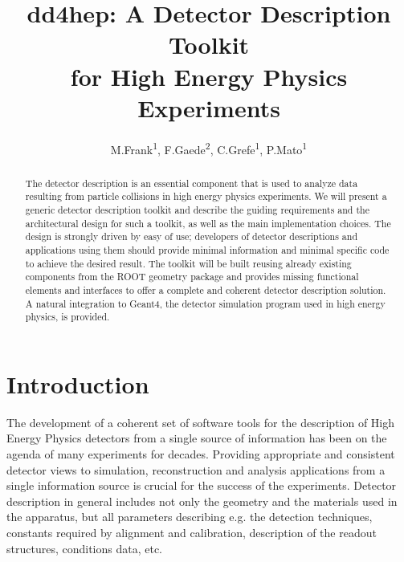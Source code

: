 \documentclass[a4paper]{jpconf}
\begin{document}
\title{dd4hep: A Detector Description Toolkit \\
for High Energy Physics Experiments}

\author{
M.Frank\textsuperscript{1},
F.Gaede\textsuperscript{2},
C.Grefe\textsuperscript{1},
P.Mato\textsuperscript{1}
}

\address{\textsuperscript{1} CERN, 1211 Geneva 23, Switzerland}
\address{\textsuperscript{2} Desy, 22607 Hamburg, Germany}


\begin{abstract}

\noindent
The detector description is an essential component that is used to analyze data
resulting from particle collisions in high energy physics experiments.
We will present a generic detector description toolkit
and describe the guiding requirements and the architectural design for
such a toolkit, as well as the main implementation choices.
The design is strongly driven by easy of use;
developers of detector descriptions and applications using
them should provide minimal information and minimal specific
code to achieve the desired result.
The toolkit will be built reusing already existing components
from the ROOT geometry package and provides missing functional
elements and interfaces to offer a complete and coherent
detector description solution. A natural integration to
Geant4, the detector simulation program used in high energy physics,
is provided.
\end{abstract}


\section{Introduction}
\label{sec:introduction}
\noindent
The development of a coherent set of software tools for the description of 
High Energy Physics detectors from a single source of information has been
on the agenda of many experiments for decades.
Providing appropriate and consistent detector views to simulation, 
reconstruction and analysis applications from a single information source
is crucial for the success of the experiments.
Detector description in general includes not only the geometry and the 
materials used in the apparatus, but all parameters describing e.g. the 
detection techniques, constants required by alignment and calibration, 
description of the readout structures, conditions data, etc. 
\end{document}

